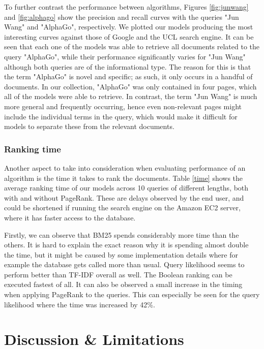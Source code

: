 To further contrast the performance between algorithms, Figures \ref{fig:junwang} and \ref{fig:alphago} show the precision and recall curves with the queries "Jun Wang" and "AlphaGo", respectively. We plotted our models producing the most interesting curves against those of Google and the UCL search engine. It can be seen that each one of the models was able to retrieve all documents related to the query "AlphaGo", while their performance significantly varies for "Jun Wang" although both queries are of the informational type. The reason for this is that the term "AlphaGo" is novel and specific; as such, it only occurs in a handful of documents. In our collection, "AlphaGo" was only contained in four pages, which all of the models were able to retrieve. In contrast, the term "Jun Wang" is much more general and frequently occurring, hence even non-relevant pages might include the individual terms in the query, which would make it difficult for models to separate these from the relevant documents.

\subsubsection{Ranking time}

Another aspect to take into consideration when evaluating performance of an algorithm is the time it takes to rank the documents. Table \ref{time} shows the average ranking time of our models across 10 queries of different lengths, both with and without PageRank. These are delays observed by the end user, and could be shortened if running the search engine on the Amazon EC2 server, where it has faster access to the database.

Firstly, we can observe that BM25 spends considerably more time than the others. It is hard to explain the exact reason why it is spending almost double the time, but it might be caused by some implementation details where for example the database gets called more than usual. Query likelihood seems to perform better than TF-IDF overall as well. The Boolean ranking can be executed fastest of all. It can also be observed a small increase in the timing when applying PageRank to the queries. This can especially be seen for the query likelihood where the time was increased by 42\%.



\section{Discussion \& Limitations} %
\label{sec:discussion_&_limitations}

